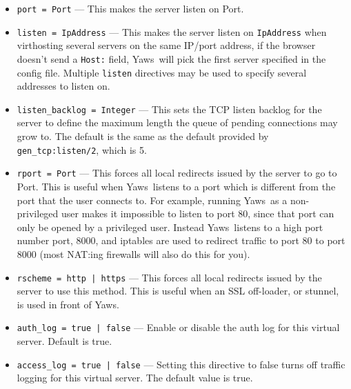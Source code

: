 \documentclass[11pt,oneside,english]{book}
\newcommand{\Yaws}            %
        {{\sc Yaws}}
\begin{document}
\begin{itemize}

\item       \verb+port = Port+ ---
              This makes the server listen on Port.

\item        \verb+listen = IpAddress+ ---
              This makes the  server  listen  on  \verb+IpAddress+  when
              virthosting  several  servers  on  the same IP/port
              address, if the browser doesn't send a \verb+Host:+ field,
              \Yaws\   will  pick  the first server specified in the
              config file. Multiple \verb+listen+ directives may be
              used to specify several addresses to listen on.

\item        \verb+listen_backlog = Integer+ ---
              This sets the TCP listen backlog for the server to
              define the maximum length the queue of pending
              connections may grow to. The default is the same as
              the default provided by \verb+gen_tcp:listen/2+, which
              is 5.

\item       \verb+rport = Port+ ---
              This forces  all  local  redirects  issued  by  the
              server  to  go  to  Port.  This is useful when \Yaws\
              listens to a port which is different from the  port
              that  the  user  connects  to. For example, running
              \Yaws\  as a non-privileged user makes  it  impossible
              to  listen  to port 80, since that port can only be
              opened by a privileged user. Instead  \Yaws\   listens
              to  a high port number port, 8000, and iptables are
              used to redirect traffic to port 80  to  port  8000
              (most NAT:ing firewalls will also do this for you).

\item       \verb+rscheme = http | https+ ---
              This forces  all  local  redirects  issued  by  the
              server  to  use this method. This is useful when an
              SSL off-loader, or stunnel, is  used  in  front  of
              \Yaws{}.

\item       \verb+auth_log = true | false+ ---
              Enable or disable the auth log for this virtual server.
              Default is true.

\item       \verb+access_log = true | false+ ---
              Setting  this  directive  to  false turns off
              traffic logging for this virtual server. The
              default value is true.


\end{itemize}
\end{document}
